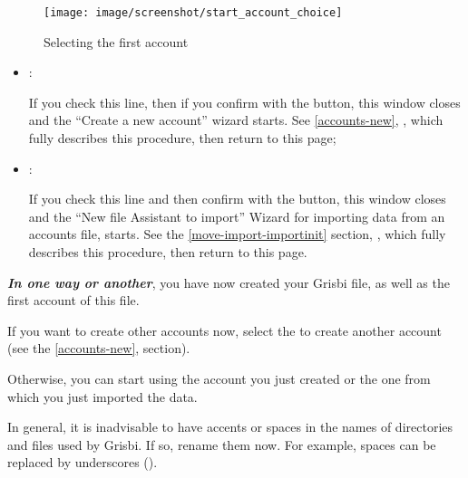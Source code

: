 \begin{enumerate}
\begin{figure}[htbp]
\begin{center}
\texttt{[image: image/screenshot/start\_account\_choice]}
\end{center}
\caption{Selecting the first account}
\label{start-account-choice-img}
\end{figure}


		\begin{itemize}
			\item {}:\par
			If you check this line, then if you confirm with the  button, this window closes and the \enquote{Create a new account} wizard starts. See  \vref{accounts-new}, ,  which fully describes this procedure, then return to this page;

			\item {}:\par
			If you check this line and then confirm with the  button, this window closes and the \enquote{New file Assistant to import} Wizard for importing data from an accounts file, starts. See the \vref{move-import-importinit} section, , which fully describes this procedure, then return to this page.
\end{itemize}
\end{enumerate}

\label{start-newfile-end}

\textit{\textbf{In one way or another}}, you have now created your Grisbi file, as well as the first account of this file.


If you want to create other accounts now, select the  to create another account (see the \vref{accounts-new},  section).


Otherwise, you can start using the account you just created or the one from which you just imported the data.


In general, it is inadvisable to have accents or spaces in the names of directories and files used by Grisbi. If so, rename them now. For example, spaces can be replaced by underscores (\underline{}).

